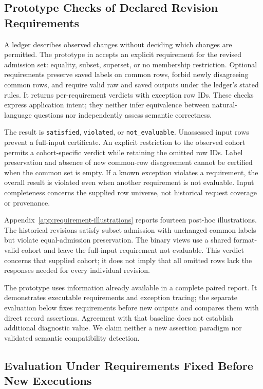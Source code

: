 \documentclass[11pt]{article}
\begin{document}
\subsection{Prototype Checks of Declared Revision Requirements}
\label{sec:revision-contracts}

A ledger describes observed changes without deciding which changes are
permitted. The prototype in  accepts an explicit
requirement for the revised admission set: equality, subset, superset, or
no membership restriction. Optional requirements preserve saved labels on
common rows, forbid newly disagreeing common rows, and require valid raw
and saved outputs under the ledger's stated rules. It returns per-requirement
verdicts with exception row IDs. These checks express application intent;
they neither infer equivalence between natural-language questions nor
independently assess semantic correctness.

The result is \texttt{satisfied}, \texttt{violated}, or
\texttt{not\_evaluable}. Unassessed input rows prevent a full-input
certificate. An explicit restriction to the observed cohort permits a
cohort-specific verdict while retaining the omitted row IDs. Label
preservation and absence of new common-row disagreement cannot be certified
when the common set is empty. If a known exception violates a requirement,
the overall result is violated even when another requirement is not
evaluable. Input completeness concerns the supplied row universe, not
historical request coverage or provenance.

Appendix~\ref{app:requirement-illustrations} reports fourteen post-hoc
illustrations. The historical revisions satisfy subset admission with
unchanged common labels but violate equal-admission preservation. The binary
views use a shared format-valid cohort and leave the full-input requirement
not evaluable. This verdict concerns that supplied cohort; it does not imply
that all omitted rows lack the responses needed for every individual revision.

The prototype uses information already available in a complete paired
report. It demonstrates executable requirements and exception tracing;
the separate evaluation below fixes requirements before new outputs and
compares them with direct record assertions. Agreement with that baseline
does not establish additional diagnostic value. We claim neither a new
assertion paradigm nor validated semantic compatibility detection.

\subsection{Evaluation Under Requirements Fixed Before New Executions}
\label{sec:revision-evaluation}
\end{document}
